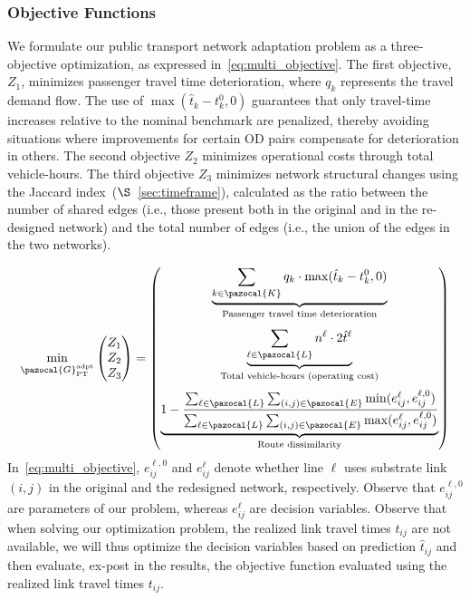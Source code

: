\documentclass[a4paper,fleqn]{cas-sc}
\begin{document}
\subsubsection{Objective Functions}\label{sec:obj}
We formulate our public transport network adaptation problem as a three-objective optimization, as expressed in~\eqref{eq:multi_objective}. The first objective, $Z_1$, minimizes passenger travel time deterioration, where $q_k$ represents the travel demand flow. 
The use of $\max(\hat{t}_k - t_k^0, 0)$ guarantees that only travel-time increases relative to the nominal benchmark are penalized, thereby avoiding situations where improvements for certain OD pairs compensate for deterioration in others. 
%
The second objective $Z_2$ minimizes operational costs through total vehicle-hours.
%
The third objective $Z_3$ minimizes network structural changes using the Jaccard index~($\S$~\ref{sec:timeframe}), calculated as the ratio between the number of shared edges (i.e., those present both in the original and in the re-designed network) and the total number of edges (i.e., the union of the edges in the two networks). 

\begin{equation}
\label{eq:multi_objective}
\min_{\pazocal{G}_{\text{PT}}^{\text{adpt}}} \begin{pmatrix} Z_1 \\ Z_2 \\ Z_3 \end{pmatrix} = \begin{pmatrix}
\underbrace{\sum_{k \in \pazocal{K}} q_k \cdot \max(\hat{t}_k - t_k^0, 0)}_{\text{Passenger travel time deterioration}} \\[8ex]
\underbrace{\sum_{\ell \in \pazocal{L}} n^\ell \cdot 2\hat{t}^\ell}_{\text{Total vehicle-hours (operating cost)}} \\[8ex]
\underbrace{1 - \frac{\sum_{\ell \in \pazocal{L}} \sum_{(i,j) \in \pazocal{E}} \min(e_{ij}^\ell, e_{ij}^{\ell, 0})}{\sum_{\ell \in \pazocal{L}} \sum_{(i,j) \in \pazocal{E}} \max(e_{ij}^\ell, e_{ij}^{\ell, 0})}}_{\text{Route dissimilarity}}
\end{pmatrix}
\end{equation}
In~\eqref{eq:multi_objective}, $e_{ij}^{\ell, 0}$ and $e_{ij}^\ell$ denote whether line $\ell$ uses substrate link $(i, j)$ in the original and the redesigned network, respectively. Observe that $e_{ij}^{\ell, 0}$ are parameters of our problem, whereas $e_{ij}^\ell$ are decision variables.
%
Observe that when solving our optimization problem, the realized link travel times $t_{ij}$ are not available, we will thus optimize the decision variables based on prediction $\hat{t}_{ij}$ and then evaluate, ex-post in the results, the objective function evaluated using the realized link travel times $t_{ij}$.
\end{document}
